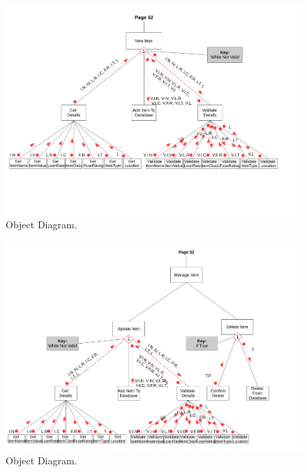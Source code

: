 \begin{landscape}
\newpage

\begin{figure}[H]
    \begin{center}
    \includegraphics[width=500px]{./Design/top_down_design/new_item.pdf}
    \caption{Object Diagram.} \label{fig:object_diagram}
    \end{center}
\end{figure}

\newpage

\begin{figure}[H]
    \begin{center}
    \includegraphics[width=500px]{./Design/top_down_design/manage_items.pdf}
    \caption{Object Diagram.} \label{fig:object_diagram}
    \end{center}
\end{figure}


\end{landscape}
